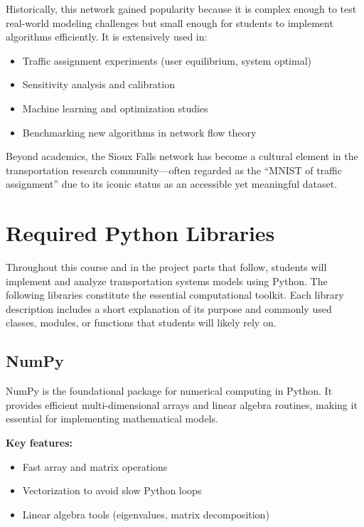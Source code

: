 \documentclass{rapportCS} %
\begin{document}
Historically, this network gained popularity because it is complex enough to test real-world modeling challenges but small enough for students to implement algorithms efficiently. It is extensively used in:
\begin{itemize}
    \item Traffic assignment experiments (user equilibrium, system optimal)
    \item Sensitivity analysis and calibration
    \item Machine learning and optimization studies
    \item Benchmarking new algorithms in network flow theory
\end{itemize}

Beyond academics, the Sioux Falls network has become a cultural element in the transportation research community---often regarded as the ``MNIST of traffic assignment'' due to its iconic status as an accessible yet meaningful dataset.



\newpage

\section{Required Python Libraries}

Throughout this course and in the project parts that follow, students will implement and analyze transportation systems models using Python. The following libraries constitute the essential computational toolkit. Each library description includes a short explanation of its purpose and commonly used classes, modules, or functions that students will likely rely on.

\subsection{NumPy}
NumPy is the foundational package for numerical computing in Python. It provides efficient multi-dimensional arrays and linear algebra routines, making it essential for implementing mathematical models.

\textbf{Key features:}
\begin{itemize}
    \item Fast array and matrix operations
    \item Vectorization to avoid slow Python loops
    \item Linear algebra tools (eigenvalues, matrix decomposition)
\end{itemize}
\end{document}
